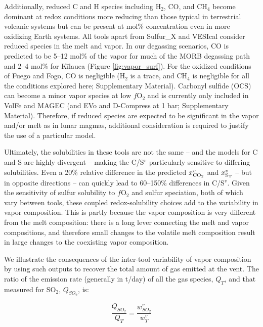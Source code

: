 \documentclass[draft, english]{volcanica-template}
\begin{document}
Additionally, reduced C and H species including H$_2$, CO, and CH$_4$ become dominant at redox conditions more reducing than those typical in terrestrial volcanic systems \parencite[$\sim$IW\,<\,1;][]{holloway1994application} but can be present at mol\% concentration even in more oxidizing Earth systems. All tools apart from Sulfur\_X and VESIcal consider reduced species in the melt and vapor. In our degassing scenarios, CO is predicted to be 5–12 mol\% of the vapor for much of the MORB degassing path and 2–4 mol\% for Kīlauea (Figure \ref{fig:vapor_surf}). For the oxidized conditions of Fuego and Fogo, CO is negligible (H$_2$ is a trace, and CH$_4$ is negligible for all the conditions explored here; Supplementary Material). Carbonyl sulfide (OCS) can become a minor vapor species at low $f$O$_2$ and is currently only included in VolFe and MAGEC (and EVo and D-Compress at 1 bar; Supplementary Material). Therefore, if reduced species are expected to be significant in the vapor and/or melt as in lunar magmas, additional consideration is required to justify the use of a particular model.

Ultimately, the solubilities in these tools are not the same -- and the models for C and S are highly divergent -- making the C/S$^v$ particularly sensitive to differing solubilities. Even a 20\% relative difference in the predicted $x^v_{\rm{CO}_2}$ and $x^v_{\rm{S}_T}$ -- but in opposite directions -- can quickly lead to 60--150\% differences in C/S$^v$. Given the sensitivity of sulfur solubility to $f$O$_2$ and sulfur speciation, both of which vary between tools, these coupled redox-solubility choices add to the variability in vapor composition. This is partly because the vapor composition is very different from the melt composition: there is a long lever connecting the melt and vapor compositions, and therefore small changes to the volatile melt composition result in large changes to the coexisting vapor composition.

We illustrate the consequences of the inter-tool variability of vapor composition by using such outputs to recover the total amount of gas emitted at the vent. The ratio of the emission rate (generally in t/day) of all the gas species, $Q_T$, and that measured for SO$_2$, $Q_{SO_2}$, is:

\begin{equation}
\frac{Q_{SO_2}}{Q_T} = \frac{w_{SO_2}^v}{w_T^v}
\end{equation}
\end{document}

